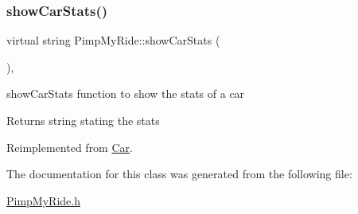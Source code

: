 \subsubsection{\texorpdfstring{show\+Car\+Stats()}{showCarStats()}}
{\footnotesize\ttfamily virtual string Pimp\+My\+Ride\+::show\+Car\+Stats (\begin{DoxyParamCaption}{ }\end{DoxyParamCaption})\hspace{0.3cm}{\ttfamily [inline]}, {\ttfamily [virtual]}}

show\+Car\+Stats function to show the stats of a car \begin{DoxyReturn}{Returns}
string stating the stats 
\end{DoxyReturn}


Reimplemented from \mbox{\hyperlink{class_car_a19567ab900b1c676f0244b15ec14dbad}{Car}}.



The documentation for this class was generated from the following file\+:\begin{DoxyCompactItemize}
\item 
\mbox{\hyperlink{_pimp_my_ride_8h}{Pimp\+My\+Ride.\+h}}\end{DoxyCompactItemize}
